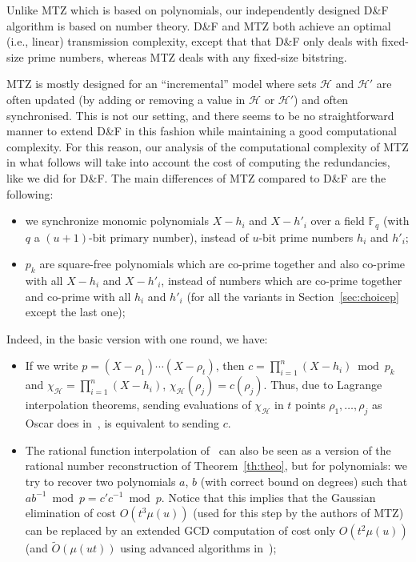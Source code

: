 \documentclass[twoside,envcountsame,runningheads]{llncs}
\newcommand{\Oapp}{\ensuremath{\tilde{O}}}
\newcommand{\Set}{\mathcal{H}}
\newcommand{\df}{D\&F\xspace}
\begin{document}
Unlike MTZ which is based on polynomials, our
independently designed \df algorithm is based on number theory.
\df and MTZ both achieve an optimal (i.e., linear) transmission complexity,
except that
that \df only deals with fixed-size prime numbers, whereas MTZ deals with any
fixed-size bitstring. 

MTZ is mostly designed for an ``incremental'' model where sets $\Set$ and
$\Set'$ are often updated (by adding or removing a value in $\Set$ or $\Set'$)
and often synchronised. This is not our setting, and there seems to be no
straightforward manner to extend \df in this fashion while maintaining a good
computational complexity. For this reason, our analysis of the computational
complexity of MTZ in what follows will take into account the cost of computing
the redundancies, like we did for \df. The main differences of MTZ compared to
\df are the following:

\begin{itemize}
\item we synchronize monomic polynomials $X-h_i$ and $X-h'_i$ over a field $\mathbb{F}_q$ (with $q$ a $(u+1)$-bit primary number), instead of $u$-bit prime numbers $h_i$ and $h'_i$;
\item $p_k$ are square-free polynomials which are co-prime together and also co-prime with all $X-h_i$ and $X-h'_i$, instead of numbers which are co-prime together and co-prime with all $h_i$ and $h'_i$ (for all the variants in Section~\ref{sec:choicep} except the last one);
\end{itemize}

\noindent Indeed, in the basic version with one round, we have:

\begin{itemize}
\item If we write $p = (X-\rho_1) \cdots (X-\rho_t)$, then $c = \prod_{i=1}^n (X-h_i) \bmod p_k$ and $\chi_\Set = \prod_{i=1}^n (X-h_i)$, $\chi_\Set(\rho_j) = c(\rho_j)$. Thus, due to Lagrange interpolation theorems, sending evaluations of $\chi_\Set$ in $t$ points $\rho_1,\dots,\rho_j$ as Oscar does in~\cite{Mins1}, is equivalent to sending $c$.
\item The rational function interpolation of~\cite{Mins1} can also be seen as a version of the rational number reconstruction of Theorem~\ref{th:theo}, but for polynomials: we try to recover two polynomials $a$, $b$ (with correct bound on degrees) such that $a b^{-1} \bmod p = c' c^{-1} \bmod p$.
Notice that this implies that the Gaussian elimination of cost $O(t^3 \mu(u))$ (used for this step by the authors of MTZ) can be replaced by an extended GCD computation of cost only $O(t^2 \mu(u))$ (and $\Oapp(\mu(ut))$ using advanced algorithms in~\cite{pan2004rational,wang2003acceleration});
\end{itemize}
\end{document}
